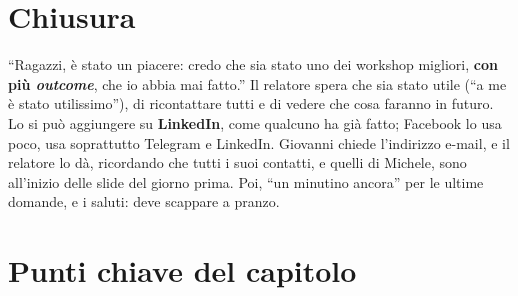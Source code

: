 \section{Chiusura}
\label{z7:sec:chiusura}

``Ragazzi, è stato un piacere: credo che sia stato uno dei workshop migliori,
\textbf{con più \emph{outcome}}, che io abbia mai fatto.'' Il relatore spera che sia
stato utile (``a me è stato utilissimo''), di ricontattare tutti e di vedere che cosa
faranno in futuro. Lo si può aggiungere su \textbf{LinkedIn}, come qualcuno ha già
fatto; Facebook lo usa poco, usa soprattutto Telegram e LinkedIn. Giovanni chiede
l'indirizzo e-mail, e il relatore lo dà, ricordando che tutti i suoi contatti, e quelli
di Michele, sono all'inizio delle slide del giorno prima. Poi, ``un minutino ancora'' per
le ultime domande, e i saluti: deve scappare a pranzo.

\section*{Punti chiave del capitolo}

